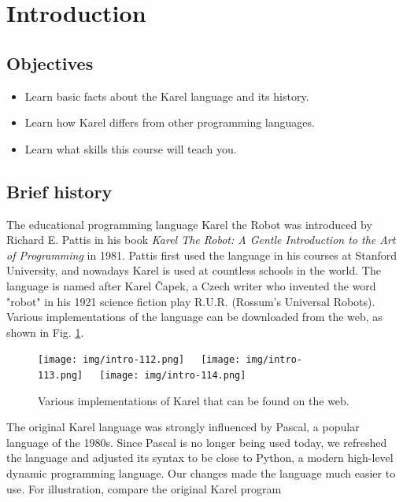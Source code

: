 \section{Introduction}

\subsection{Objectives} 

\begin{itemize}
\item Learn basic facts about the Karel language and its history. 
\item Learn how Karel differs from other programming languages.
\item Learn what skills this course will teach you.
\end{itemize}

\subsection{Brief history}

The educational programming language Karel the Robot was introduced by Richard E. 
Pattis in his book {\em Karel The Robot: A Gentle Introduction to the Art of Programming} in 1981. 
Pattis first used the language in his courses at Stanford University, and nowadays Karel is used at 
countless schools in the world. The language is named after Karel \v{C}apek, a Czech writer 
who invented the word "robot" in his 1921 science fiction play R.U.R. (Rossum's Universal Robots).
Various implementations of the language can be downloaded from the web, as shown in Fig. 
\ref{fig:intro-111}.

\begin{figure}[!ht]
\begin{center}
\texttt{[image: img/intro-112.png]}\ \ \ 
\texttt{[image: img/intro-113.png]}\ \ \ 
\texttt{[image: img/intro-114.png]}
\caption{Various implementations of Karel that can be found on the web.}
\vspace{-4mm}
\label{fig:intro-111}
\end{center}
\end{figure}
\noindent
The original Karel language was strongly influenced by Pascal, a popular
language of the 1980s. 
Since Pascal is no longer being used today, we refreshed 
the language and adjusted its syntax to be close to Python, a modern high-level 
dynamic programming language. Our changes made the language much easier
to use. For illustration, compare the original Karel program\\

